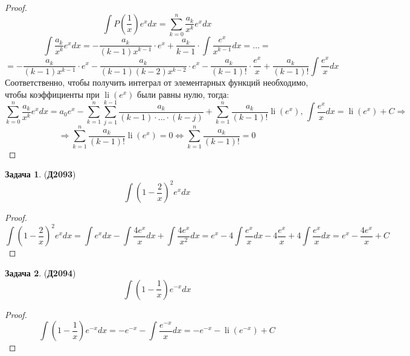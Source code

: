 \documentclass[12pt]{article}
\theoremstyle{definition}
\newtheorem{problem}{Задача}
\newcommand{\ddsum}[2]{\displaystyle\sum\limits_{#1}^{#2}}
\DeclareMathOperator{\dint}{\displaystyle\int}
\DeclareMathOperator{\li}{\operatorname{li}}
\begin{document}
\begin{proof}
	$$
		\dint P\left(\dfrac{1}{x}\right)e^xdx = \ddsum{k = 0}{n}\dfrac{a_k}{x^k}e^xdx
	$$
	$$
		\dint \dfrac{a_k}{x^k}e^xdx = -\dfrac{a_k}{(k-1)x^{k-1}}{\cdot}e^x + \dfrac{a_k}{k-1}{\cdot}\dint\dfrac{e^x}{x^{k-1}}dx = \dotsc =  
	$$
	$$
		= -\dfrac{a_k}{(k-1)x^{k-1}}{\cdot}e^x  -\dfrac{a_k}{(k-1)(k-2)x^{k-2}}{\cdot}e^x - \dfrac{a_k}{(k-1)!}{\cdot}\dfrac{e^x}{x} + \dfrac{a_k}{(k-1)!}\dint\dfrac{e^x}{x}dx
	$$
	Соответственно, чтобы получить интеграл от элементарных функций необходимо, чтобы коэффициенты при $\li(e^x)$ были равны нулю, тогда:
	$$
		\ddsum{k = 0}{n}\dfrac{a_k}{x^k}e^xdx = a_0 e^x -\ddsum{k = 1}{n}\ddsum{j = 1}{k-1}\dfrac{a_k}{(k-1){\cdot}\dotsc{\cdot}(k-j)} + \ddsum{k = 1}{n}\dfrac{a_k}{(k-1)!}\li(e^x), \, \dint \dfrac{e^x}{x}dx = \li(e^x) + C \Rightarrow
	$$
	$$
		\Rightarrow \ddsum{k = 1}{n}\dfrac{a_k}{(k-1)!}\li(e^x) = 0  \Leftrightarrow \ddsum{k = 1}{n}\dfrac{a_k}{(k-1)!} = 0
	$$
\end{proof}


\begin{problem}(\textbf{Д2093})
	$$
		\dint \left(1 - \dfrac{2}{x}\right)^2 e^x dx
	$$
\end{problem}
\begin{proof}
	$$
		\dint \left(1 - \dfrac{2}{x}\right)^2 e^x dx = \dint e^x dx - \dint \dfrac{4e^x}{x}dx + \dint \dfrac{4e^x}{x^2}dx = e^x - 4\dint \dfrac{e^x}{x}dx - 4\dfrac{e^x}{x} + 4\dint \dfrac{e^x}{x}dx = e^x -\dfrac{4e^x}{x} + C
	$$
\end{proof}

\begin{problem}(\textbf{Д2094})
	$$
		\dint \left(1 - \dfrac{1}{x}\right) e^{-x} dx
	$$
\end{problem}
\begin{proof}
	$$
		\dint \left(1 - \dfrac{1}{x}\right) e^{-x} dx = -e^{-x} - \dint\dfrac{e^{-x}}{x}dx = -e^{-x} - \li(e^{-x}) + C
	$$
\end{proof}
\end{document}
